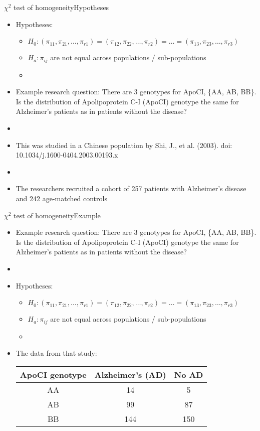 \documentclass[xcolor=dvipsnames]{beamer}
\begin{document}
\begin{frame}{$\chi^2$ test of homogeneity}{Hypotheses}
\begin{itemize}
	\item Hypotheses:
	\begin{itemize}
		\item $H_0: (\pi_{11}, \pi_{21}, \hdots, \pi_{r1})=(\pi_{12}, \pi_{22}, \hdots, \pi_{r2})=\dots = (\pi_{13}, \pi_{23}, \hdots, \pi_{r3})$
		\item $H_a: \pi_{ij}$ are not equal across populations / sub-populations
		\item[]
	\end{itemize}
	\item Example research question: There are 3 genotypes for ApoCI, \{AA, AB, BB\}. Is the distribution of Apolipoprotein C-I (ApoCI) genotype the same for Alzheimer's patients as in patients without the disease? 
	\item[]
	\item This was studied in a Chinese population by Shi, J., et al. (2003). doi: 10.1034/j.1600-0404.2003.00193.x
	\item[]
	\item The researchers recruited a cohort of 257 patients with Alzheimer's disease and 242 age-matched controls
\end{itemize}
\end{frame}

\begin{frame}{$\chi^2$ test of homogeneity}{Example}
\begin{itemize}
	\item Example research question: There are 3 genotypes for ApoCI, \{AA, AB, BB\}. Is the distribution of Apolipoprotein C-I (ApoCI) genotype the same for Alzheimer's patients as in patients without the disease? 
	\item[]
	\item Hypotheses:
	\begin{itemize}
		\item $H_0: (\pi_{11}, \pi_{21}, \hdots, \pi_{r1})=(\pi_{12}, \pi_{22}, \hdots, \pi_{r2})=\dots = (\pi_{13}, \pi_{23}, \hdots, \pi_{r3})$
		\item $H_a: \pi_{ij}$ are not equal across populations / sub-populations
		\item[]
	\end{itemize}
	\item The data from that study:
	\begin{center}
		\begin{tabular}{c|cc}
			\hline
			\textbf{ApoCI genotype} & \textbf{Alzheimer's (AD)} & \textbf{No AD} \\ \hline
			AA & 14 & 5 \\
			AB & 99 & 87 \\
			BB & 144 & 150 \\ \hline
		\end{tabular}
	\end{center}
\end{itemize}
\end{frame}
\end{document}
